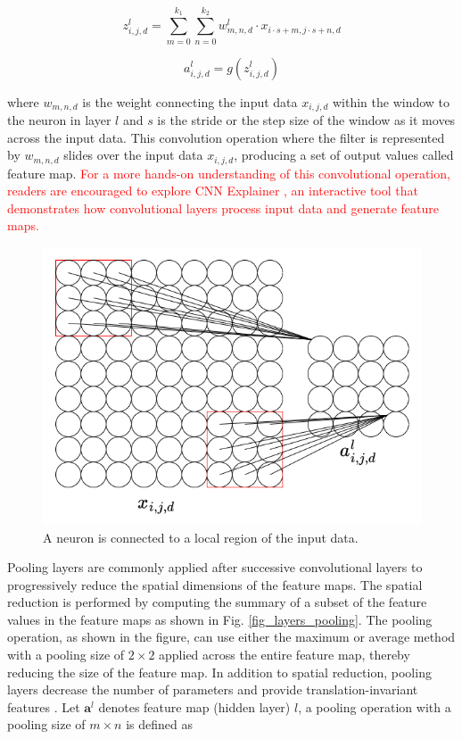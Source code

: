 \documentclass[preprint,12pt]{elsarticle}
\begin{document}
\begin{equation}
z_{i,j,d}^l=\sum_{m=0}^{k_1} \sum_{n=0}^{k_2} w_{m,n,d}^{l} \cdot x_{i\cdot s +m,j\cdot s+n,d}
\end{equation}

\begin{equation}
a_{i,j,d}^l=g(z_{i,j,d}^l)
\end{equation}

\noindent where $w_{m,n,d}$ is the weight connecting the input data $x_{i,j,d}$ within the window to the neuron in layer $l$ and $s$ is the stride or the step size of the window as it moves across the input data. This convolution operation where the filter is represented by $w_{m,n,d}$ slides over the input data $x_{i,j,d}$, producing a set of output values called feature map. \textcolor{red}{For a more hands-on understanding of this convolutional operation, readers are encouraged to explore CNN Explainer \citep{noauthor_poloclubcnn-explainer_2025}, an interactive tool that demonstrates how convolutional layers process input data and generate feature maps.}

\begin{figure}[h!]
\centering
\includegraphics[scale=0.4]{fig_layers_convolution.png}
\caption{A neuron is connected to a local region of the input data.}
\label{fig_layers_convolution}
\end{figure}

Pooling layers are commonly applied after successive convolutional layers to progressively reduce the spatial dimensions of the feature maps. The spatial reduction is performed by computing the summary of a subset of the feature values in the feature maps as shown in Fig. \ref{fig_layers_pooling}. The pooling operation, as shown in the figure, can use either the maximum or average method with a pooling size of $2 \times 2$ applied across the entire feature map, thereby reducing the size of the feature map. In addition to spatial reduction, pooling layers decrease the number of parameters and provide translation-invariant features \citep{lecun_deep_2015}. Let $\mathbf{a}^l$ denotes feature map (hidden layer) $l$, a pooling operation with a pooling size of $m \times n$ is defined as
\end{document}
